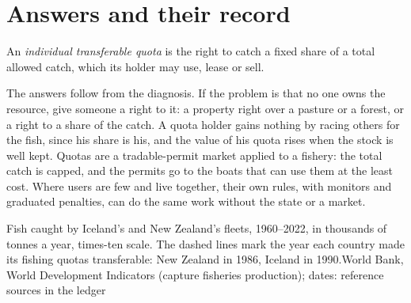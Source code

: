 \section{Answers and their record}\label{sec:g11:public-goods-and-commons:answers}

\begin{definition}\label{def:g11:public-goods-and-commons:itq}
An \emph{individual transferable quota} is the right to catch a fixed share of a total allowed catch, which its holder may use,
lease or sell.
\end{definition}

The answers follow from the diagnosis. If the problem is that no one owns the resource, give someone a right to it: a property right over a pasture or a forest, or
a right to a share of the catch. A quota holder gains nothing by racing others for the fish, since his share is his, and the value of his quota rises when the stock
is well kept. Quotas are a tradable-permit market applied to a fishery: the total catch is capped, and the permits go to the boats that can use them at the least cost.
Where users are few and live together, their own rules, with monitors and graduated penalties, can do the same work without the state or a market.

\begin{omchart}{Fish caught by Iceland's and New Zealand's fleets, 1960--2022, in thousands of tonnes a year, times-ten scale. The dashed lines mark the year each
country made its fishing quotas transferable: New Zealand in 1986, Iceland in 1990.}{World Bank, World Development Indicators (capture fisheries production); dates:
reference sources in the ledger}
\end{omchart}

